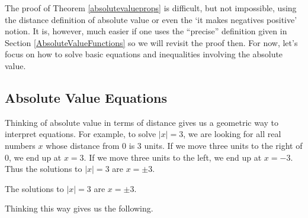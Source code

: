 \documentclass{ximera}
\begin{document}

 

The proof of Theorem \ref{absolutevalueprops} is difficult, but not impossible, using the distance definition of absolute value or even the `it makes negatives positive' notion.  It is, however, much easier if one uses the ``precise'' definition given in Section \ref{AbsoluteValueFunctions} so we will revisit the proof then.  For now, let's focus on how to solve basic equations and inequalities involving the absolute value.

\subsection{Absolute Value Equations}
\label{basicabsvaleqns}

Thinking of absolute value in terms of distance gives us a geometric way to interpret equations.  For example, to solve $|x| = 3$, we are looking for all real numbers $x$ whose distance from $0$ is $3$ units.  If we move three units to the right of $0$, we end up at $x = 3$.  If we move three units to the left, we end up at $x = -3$.  Thus the solutions to  $|x| = 3$ are $x = \pm 3$.  


\begin{center}

The solutions to $|x| = 3$ are $x=\pm3$.

\end{center}

Thinking this way gives us the following.

\end{document}
